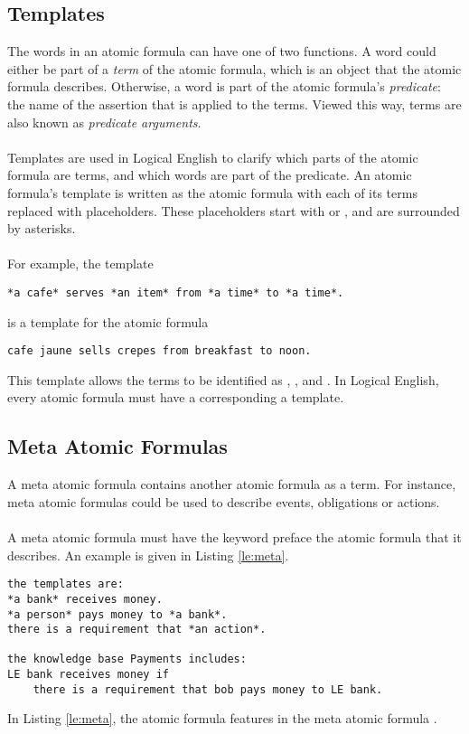 \documentclass[../main.tex]{subfiles}
\begin{document}
\subsection{Templates}
The words in an atomic formula can have one of two functions. A word could either be part of a \textit{term} of the atomic formula, which is an object that the atomic formula describes. Otherwise, a word is part of the atomic formula's \textit{predicate}: the name of the assertion that is applied to the terms. Viewed this way, terms are also known as \textit{predicate arguments}.
\\
\\
Templates are used in Logical English to clarify which parts of the atomic formula are terms, and which words are part of the predicate. An atomic formula's template is written as the atomic formula with each of its terms replaced with placeholders. These placeholders start with  or , and are surrounded by asterisks. 
\\
\\
For example, the template
\begin{lstlisting}[language={LE},caption={A template in Logical English},label={le:template}]
    *a cafe* serves *an item* from *a time* to *a time*.
\end{lstlisting}
is a template for the atomic formula
\begin{lstlisting}[language={LE}]
    cafe jaune sells crepes from breakfast to noon.
\end{lstlisting}
This template allows the terms to be identified as , ,  and . In Logical English, every atomic formula must have a corresponding a template.

\subsection{Meta Atomic Formulas}
A meta atomic formula contains another atomic formula as a term. For instance, meta atomic formulas could be used to describe events, obligations or actions. 
\\
\\
A meta atomic formula must have the keyword  preface the atomic formula that it describes. An example is given in Listing \ref{le:meta}.
\begin{lstlisting}[language=LE,label={le:meta},caption={An example of an atomic formula featuring in a meta atomic formula.}]
the templates are:
*a bank* receives money.
*a person* pays money to *a bank*.
there is a requirement that *an action*.

the knowledge base Payments includes:
LE bank receives money if
    there is a requirement that bob pays money to LE bank.
\end{lstlisting}
In Listing \ref{le:meta}, the atomic formula  features in the meta atomic formula .
\end{document}
